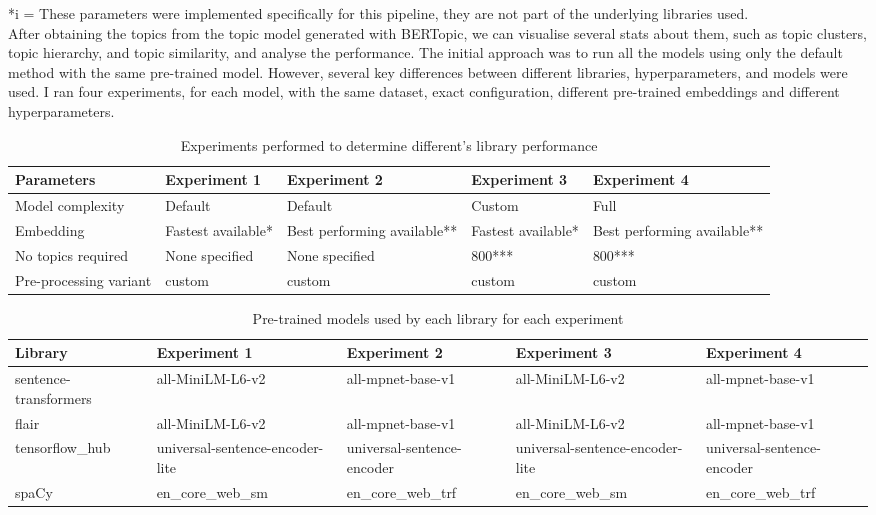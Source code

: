\documentclass[12pt,MSc,a4paper,oneside]{muthesis}
\begin{document}
*i = These parameters were implemented specifically for this pipeline, they are not part of the underlying libraries used. \\
After obtaining the topics from the topic model generated with BERTopic, we can visualise several stats about them, such as topic clusters, topic hierarchy, and topic similarity, and analyse the performance.
The initial approach was to run all the models using only the default method with the same pre-trained model. However, several key differences between different libraries, hyperparameters, and models were used. I ran four experiments, for each model, with the same dataset, exact configuration, different pre-trained embeddings and different hyperparameters.

\begin{table}[h]
  \caption{Experiments performed to determine different's library performance}
  \label{tab:experiments}
  \begin{tabularx}{\textwidth}{|X|X|X|X|X|}
    \toprule
    {Parameters}&{Experiment 1}&{Experiment 2}&{Experiment 3}&{Experiment 4}\\
    \midrule
    Model complexity & Default & Default & Custom & Full\\\hline
    Embedding & Fastest available* & Best performing available** & Fastest available* & Best performing available**\\\hline
    No topics required & None specified & None specified & 800*** & 800*** \\\hline
    Pre-processing variant & custom & custom & custom & custom\\
  \bottomrule
\end{tabularx}
\end{table}

\begin{table}[h]
  \caption{Pre-trained models used by each library for each experiment}
  \label{tab:pretrained-models}
  \begin{tabularx}{\textwidth}{| X  X  X  X  X |}
    \toprule
    {Library}&{Experiment 1}&{Experiment 2}&{Experiment 3}&{Experiment 4}\\
    \midrule
    sentence-transformers & all-MiniLM-L6-v2 & all-mpnet-base-v1 & all-MiniLM-L6-v2 & all-mpnet-base-v1\\\hline
    flair & all-MiniLM-L6-v2 & all-mpnet-base-v1 & all-MiniLM-L6-v2 & all-mpnet-base-v1\\\hline
    tensorflow_hub & universal-sentence-encoder-lite  & universal-sentence-encoder  & universal-sentence-encoder-lite  & universal-sentence-encoder \\\hline
    spaCy & en\_core\_web\_sm & en\_core\_web\_trf & en\_core\_web\_sm & en\_core\_web\_trf\\
  \bottomrule
\end{tabularx}
\end{table}
\end{document}
